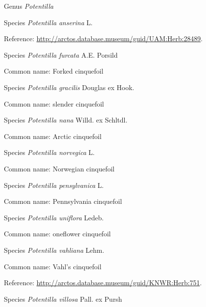 \documentclass[9pt, article]{memoir}
\begin{document}
\begin{multicols}{2}
\vspace{6pt}\noindent\hspace{30pt}Genus \textit{Potentilla}


\vspace{6pt}\noindent\hspace{36pt}Species \textit{Potentilla anserina} L.


Reference: 
\url{http://arctos.database.museum/guid/UAM:Herb:28489}.

\vspace{6pt}\noindent\hspace{36pt}Species \textit{Potentilla furcata} A.E. Porsild


Common name: Forked cinquefoil

\vspace{6pt}\noindent\hspace{36pt}Species \textit{Potentilla gracilis} Douglas ex Hook.


Common name: slender cinquefoil

\vspace{6pt}\noindent\hspace{36pt}Species \textit{Potentilla nana} Willd. ex Schltdl.


Common name: Arctic cinquefoil

\vspace{6pt}\noindent\hspace{36pt}Species \textit{Potentilla norvegica} L.


Common name: Norwegian cinquefoil

\vspace{6pt}\noindent\hspace{36pt}Species \textit{Potentilla pensylvanica} L.


Common name: Pennsylvania cinquefoil

\vspace{6pt}\noindent\hspace{36pt}Species \textit{Potentilla uniflora} Ledeb.


Common name: oneflower cinquefoil

\vspace{6pt}\noindent\hspace{36pt}Species \textit{Potentilla vahliana} Lehm.


Common name: Vahl's cinquefoil

Reference: 
\url{http://arctos.database.museum/guid/KNWR:Herb:751}.

\vspace{6pt}\noindent\hspace{36pt}Species \textit{Potentilla villosa} Pall. ex Pursh



\end{multicols}
\end{document}
